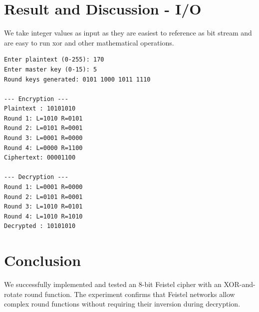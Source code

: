 \section{Result and Discussion - I/O}
We take integer values as input as they are easiest to reference as bit stream and are easy to run xor and other mathematical operations. 
\begin{verbatim}
Enter plaintext (0-255): 170
Enter master key (0-15): 5
Round keys generated: 0101 1000 1011 1110

--- Encryption ---
Plaintext : 10101010
Round 1: L=1010 R=0101
Round 2: L=0101 R=0001
Round 3: L=0001 R=0000
Round 4: L=0000 R=1100
Ciphertext: 00001100

--- Decryption ---
Round 1: L=0001 R=0000
Round 2: L=0101 R=0001
Round 3: L=1010 R=0101
Round 4: L=1010 R=1010
Decrypted : 10101010
\end{verbatim}


\section{Conclusion}
We successfully implemented and tested an 8-bit Feistel cipher with an XOR-and-rotate round function. The experiment confirms that Feistel networks allow complex round functions without requiring their inversion during decryption.
